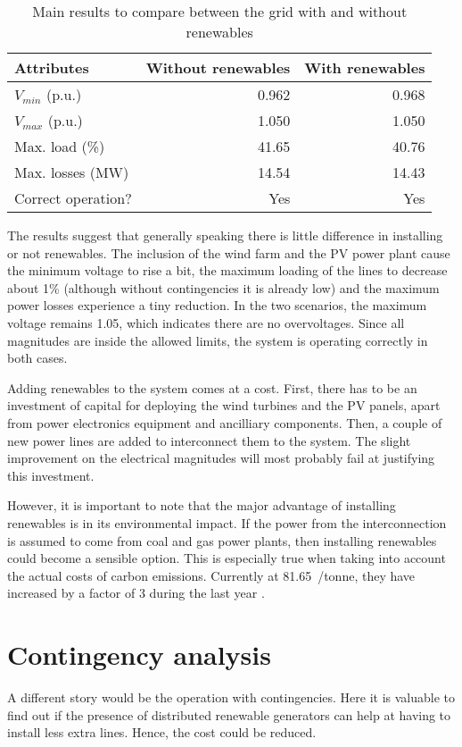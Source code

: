 \begin{table}[!htb]\centering
  \begin{tabular}{lrr}
    \hline
    \textbf{Attributes} & \textbf{Without renewables} & \textbf{With renewables}\\
    \hline
    $V_{min}$ (p.u.) & 0.962 & 0.968 \\
    $V_{max}$ (p.u.) & 1.050 & 1.050 \\
    Max. load (\%) & 41.65 & 40.76 \\
    Max. losses (MW) & 14.54 & 14.43 \\
    Correct operation? & Yes & Yes \\
    \hline
  \end{tabular}
  \caption{Main results to compare between the grid with and without renewables}
  \label{tab:compare}
\end{table}
The results suggest that generally speaking there is little difference in installing or not renewables. The inclusion of the wind farm and the PV power plant cause the minimum voltage to rise a bit, the maximum loading of the lines to decrease about 1\% (although without contingencies it is already low) and the maximum power losses experience a tiny reduction. In the two scenarios, the maximum voltage remains 1.05, which indicates there are no overvoltages. Since all magnitudes are inside the allowed limits, the system is operating correctly in both cases.

Adding renewables to the system comes at a cost. First, there has to be an investment of capital for deploying the wind turbines and the PV panels, apart from power electronics equipment and ancilliary components. Then, a couple of new power lines are added to interconnect them to the system. The slight improvement on the electrical magnitudes will most probably fail at justifying this investment. 

However, it is important to note that the major advantage of installing renewables is in its environmental impact. If the power from the interconnection is assumed to come from coal and gas power plants, then installing renewables could become a sensible option. This is especially true when taking into account the actual costs of carbon emissions. Currently at 81.65~\texteuro/tonne, they have increased by a factor of 3 during the last year \cite{carbon}. 




\section{Contingency analysis}
A different story would be the operation with contingencies. Here it is valuable to find out if the presence of distributed renewable generators can help at having to install less extra lines. Hence, the cost could be reduced. 

